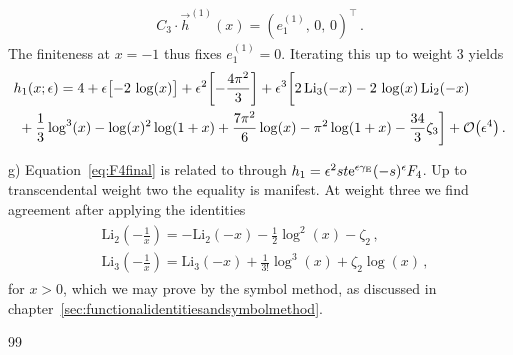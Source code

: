 \begin{align}
C_3 \cdot \vec{h}^{(1)}(x) = \left( e_1^{(1)} , \, 0, \, 0 \right)^{\top} \,.
\end{align}
The finiteness at $x=-1$ thus fixes $e_1^{(1)} = 0$. Iterating this up to weight 3 yields
\begin{align} \label{eq:boxDE_result} \begin{aligned}
& h_1 (x;\epsilon) =  4 + \epsilon \bigl[ - 2 \, \log(x) \bigr] + \epsilon^2 \biggl[ - \frac{4 \pi^2}{3} \biggr] + \epsilon^3 \biggl[ 
2 \, \text{Li}_3(-x) - 2 \, \log(x) \, \text{Li}_2(-x) \\
& \ + \frac{1}{3} \log^3(x)  - \log(x)^2 \log(1 + x) + \frac{7 \pi^2}{6} \log(x)   - \pi^2 \log(1 + x)  - \frac{34}{3} \zeta_3
\biggr] + \mathcal{O}\bigl(\epsilon^4\bigr) \,.
\end{aligned} \end{align}

\smallskip
\noindent
g) Equation~\eqref{eq:F4final} is related to  through $h_1 = \epsilon^2 s t \mathrm{e}^{\epsilon \gamma_{\text{E}}} (-s)^{\epsilon} F_4$. Up to transcendental weight two the equality is manifest. At weight three we find agreement after applying the identities
\begin{align} \label{eq:LiIdsmx} \begin{aligned}
& \mathrm{Li}_2\left(-\frac{1}{x}\right) =  - \mathrm{Li}_2(-x)-\frac{1}{2} \log^2(x)-\zeta_2 \,, \\
& \mathrm{Li}_3\left(-\frac{1}{x}\right) =  \mathrm{Li}_3(-x)+\frac{1}{3!} \log^3(x)+\zeta_2 \log(x) \,,
\end{aligned} \end{align}
for $x>0$, which we may prove by the symbol method, as discussed in chapter~\ref{sec:functionalidentitiesandsymbolmethod}.


\begin{thebibliography}{99}

\end{thebibliography}